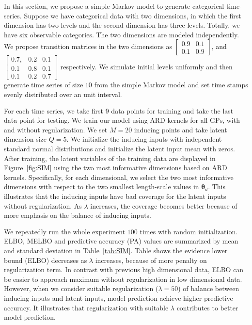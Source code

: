 \documentclass{article}
\begin{document}
In this section, we propose a simple Markov model to generate categorical time-series. Suppose we have categorical data with two dimensions, in which the first dimension has two levels and the second dimension has three levels. Totally, we have six observable categories. The two dimensions are modeled independently. We propose transition matrices in the two dimensions as $\begin{bmatrix}
0.9 & 0.1\\
0.1 & 0.9
\end{bmatrix}$, 
and$ \begin{bmatrix}
0.7, & 0.2 & 0.1 \\
0.1 & 0.8 & 0.1\\
0.1 & 0.2 & 0.7
\end{bmatrix}$ respectively. We simulate initial levels uniformly and then generate time series of size $10$ from the simple Markov model and set time stamps evenly distributed over an unit interval. 

For each time series, we take first 9 data points for training and 
take the last data point for testing. We train our model using ARD kernels for all GPs, with and without regularization. We set $M = 20$ inducing points and take latent dimension size $Q = 5$. We initialize the inducing inputs with independent standard normal distributions and initialize the latent input mean with zeros. After training, the latent variables of the training data are displayed in Figure~\ref{fig:SIM} using the two most informative dimensions based on ARD kernels. Specifically, for each dimensional, we select the two most informative dimensions with respect to the two smallest length-scale values in $\bm\theta_d$. This illustrates that the inducing inputs have bad coverage for the latent inputs without regularization. As $\lambda$ increases, the coverage becomes better because of more emphasis on the balance of inducing inputs.

We repeatedly run the whole experiment $100$ times with random initialization. ELBO, MELBO and predictive accuracy (PA) values are summarized by mean and standard deviation in Table~\ref{tab:SIM}.  Table shows the evidence lower bound (ELBO) decreases as $\lambda$ increases, because of more penalty on regularization term. In contrast with previous high dimensional data, ELBO can be easier to approach maximum without regularization in low dimensional data. However, when we consider suitable regularization ($\lambda = 50$) of balance between inducing inputs and latent inputs, model prediction achieve higher predictive accuracy. It illustrates that regularization with suitable $\lambda$ contributes to better model prediction. 
\end{document}
